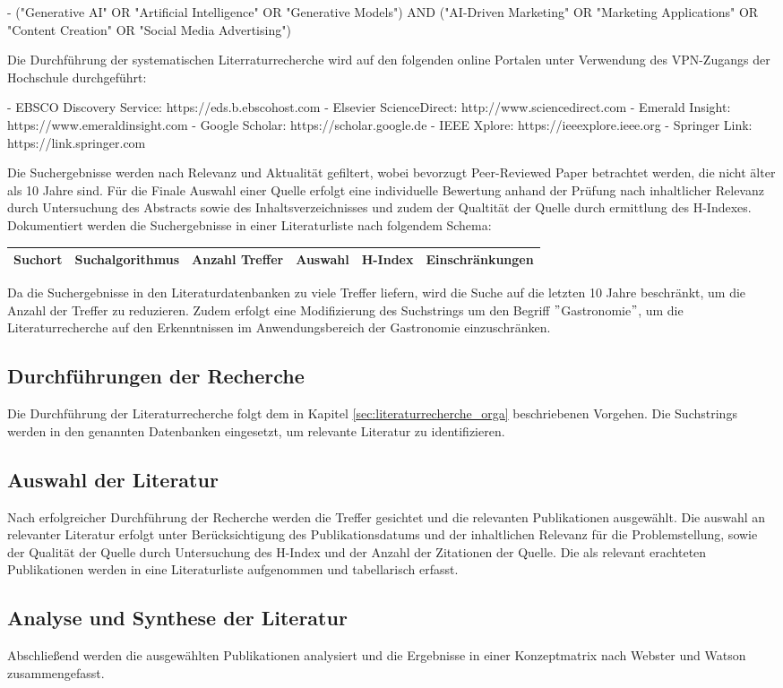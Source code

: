 \documentclass[11pt]{article}
\begin{document}
- ("Generative AI" OR "Artificial Intelligence" OR "Generative Models") AND ("AI-Driven Marketing" OR "Marketing Applications" OR "Content Creation" OR "Social Media Advertising")

Die Durchführung der systematischen Literraturrecherche wird auf den folgenden online Portalen unter Verwendung des VPN-Zugangs der Hochschule durchgeführt:

- EBSCO Discovery Service: https://eds.b.ebscohost.com
- Elsevier ScienceDirect: http://www.sciencedirect.com
- Emerald Insight: https://www.emeraldinsight.com
- Google Scholar: https://scholar.google.de
- IEEE Xplore: https://ieeexplore.ieee.org
- Springer Link: https://link.springer.com

Die Suchergebnisse werden nach Relevanz und Aktualität gefiltert, wobei bevorzugt Peer-Reviewed Paper betrachtet werden, die nicht älter als 10 Jahre sind.
Für die Finale Auswahl einer Quelle erfolgt eine individuelle Bewertung anhand der Prüfung nach inhaltlicher Relevanz durch Untersuchung des Abstracts sowie des Inhaltsverzeichnisses und zudem der Qualtität der Quelle durch ermittlung des H-Indexes.
Dokumentiert werden die Suchergebnisse in einer Literaturliste nach folgendem Schema:

\begin{tabular}{|l|l|l|l|l|l|}
\hline
Suchort & Suchalgorithmus & Anzahl Treffer & Auswahl & H-Index & Einschränkungen \\ \hline
\end{tabular}

Da die Suchergebnisse in den Literaturdatenbanken zu viele Treffer liefern, wird die Suche auf die letzten 10 Jahre beschränkt, um die Anzahl der Treffer zu reduzieren.
Zudem erfolgt eine Modifizierung des Suchstrings um den Begriff \("\)Gastronomie\("\), um die Literaturrecherche auf den Erkenntnissen im Anwendungsbereich der Gastronomie einzuschränken.

\subsection{Durchführungen der Recherche}

Die Durchführung der Literaturrecherche folgt dem in Kapitel \ref{sec:literaturrecherche_orga} beschriebenen Vorgehen.
Die Suchstrings werden in den genannten Datenbanken eingesetzt, um relevante Literatur zu identifizieren.

\subsection{Auswahl der Literatur}
Nach erfolgreicher Durchführung der Recherche werden die Treffer gesichtet und die relevanten Publikationen ausgewählt.
Die auswahl an relevanter Literatur erfolgt unter Berücksichtigung des Publikationsdatums und der inhaltlichen Relevanz für die Problemstellung, sowie der Qualität der Quelle durch Untersuchung des H-Index und der Anzahl der Zitationen der Quelle.
Die als relevant erachteten Publikationen werden in eine Literaturliste aufgenommen und tabellarisch erfasst.

\subsection{Analyse und Synthese der Literatur}
Abschließend werden die ausgewählten Publikationen analysiert und die Ergebnisse in einer Konzeptmatrix nach Webster und Watson zusammengefasst.
\end{document}
